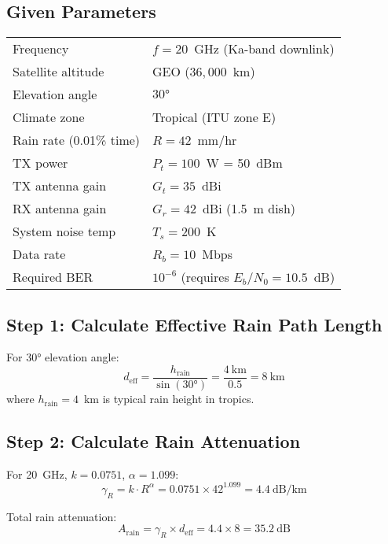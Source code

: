 \subsection*{Given Parameters}

\begin{tabular}{@{}ll@{}}
Frequency & $f = 20$~GHz (Ka-band downlink) \\
Satellite altitude & GEO ($36{,}000$~km) \\
Elevation angle & $30°$ \\
Climate zone & Tropical (ITU zone E) \\
Rain rate (0.01\% time) & $R = 42$~mm/hr \\
TX power & $P_t = 100$~W = 50~dBm \\
TX antenna gain & $G_t = 35$~dBi \\
RX antenna gain & $G_r = 42$~dBi (1.5~m dish) \\
System noise temp & $T_s = 200$~K \\
Data rate & $R_b = 10$~Mbps \\
Required BER & $10^{-6}$ (requires $E_b/N_0 = 10.5$~dB) \\
\end{tabular}

\subsection*{Step 1: Calculate Effective Rain Path Length}

For $30°$ elevation angle:
\begin{equation}
d_{\text{eff}} = \frac{h_{\text{rain}}}{\sin(30°)} = \frac{4~\text{km}}{0.5} = 8~\text{km}
\end{equation}
where $h_{\text{rain}} = 4$~km is typical rain height in tropics.

\subsection*{Step 2: Calculate Rain Attenuation}

For 20~GHz, $k = 0.0751$, $\alpha = 1.099$:
\begin{equation}
\gamma_R = k \cdot R^\alpha = 0.0751 \times 42^{1.099} = 4.4~\text{dB/km}
\end{equation}

Total rain attenuation:
\begin{equation}
A_{\text{rain}} = \gamma_R \times d_{\text{eff}} = 4.4 \times 8 = 35.2~\text{dB}
\end{equation}

